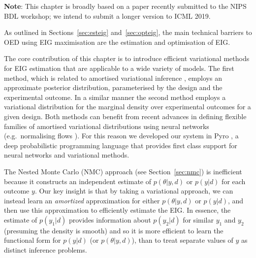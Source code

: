 \textbf{Note}: This chapter is broadly based on a paper recently submitted to the NIPS BDL workshop; we intend to submit a longer version to ICML 2019.
\bigskip

As outlined in Sections~\ref{sec:esteig} and~\ref{sec:opteig}, the main technical barriers to OED using EIG maximisation are the estimation and optimisation of EIG.

The core contribution of this chapter is to introduce efficient variational methods for EIG estimation that are applicable to a wide variety of models.
The first method, which is related to amortised variational inference \cite{dayan1995helmholtz,kingma2014auto,paige2016inference,rezende2014stochastic,stuhlmuller2013learning}, employs an approximate posterior distribution, parameterised by the design and the experimental outcome. In a similar manner the second method employs a variational distribution for the marginal density over experimental outcomes for a given design. 
Both methods can benefit from recent advances in defining flexible families of amortised variational distributions 
using neural networks (e.g.~normalising flows \cite{rezende2015variational,tabak2013family}). For this reason we developed our system in Pyro \cite{pyro}, a deep probabilistic programming language that provides first class support for neural networks and variational methods.  

The Nested Monte Carlo (NMC) approach (see Section~\ref{sec:nmc}) is inefficient because it constructs an independent estimate of $p(\theta | y, d)$ or $p(y|d)$ for each outcome $y$.
Our key insight is that by taking a variational approach, we can instead learn an \emph{amortized} approximation
for either $p(\theta|y,d)$ or $p(y|d)$, and then use this approximation to efficiently estimate the EIG.  In
essence, the estimate of $p(y_1|d)$ provides information about $p(y_2|d)$ for similar $y_1$ and $y_2$ (presuming
the density is smooth) and so it is more efficient to learn the functional form for $p(y|d)$ (or $p(\theta|y,d)$),
than to treat separate values of $y$ as distinct inference problems.

